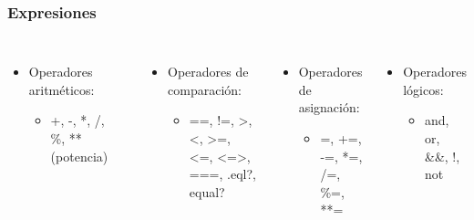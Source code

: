 \documentclass{beamer}
\begin{document}
\begin{frame}
\frametitle{Expresiones}
\begin{columns}[c] %

\begin{itemize}
  \item Operadores aritm\'eticos:
    \begin{itemize}
      \item +, -, *, /, \%, ** (potencia)
    \end{itemize}
\end{itemize}

\frametitle{}
\begin{itemize}
  \item Operadores de comparaci\'on:
  \begin{itemize}
    \item ==, !=, >, <, >=, <=, <=>, ===, .eql?, equal?
  \end{itemize}
\end{itemize}

\begin{itemize}
  \item Operadores de asignaci\'on:
  \begin{itemize}
    \item =, +=, -=, *=, /=, \%=, **=
  \end{itemize}
\end{itemize}

\begin{itemize}
  \item Operadores l\'ogicos:
  \begin{itemize}
    \item and, or, \&\&, !, not
  \end{itemize}
\end{itemize}
\end{columns}
\end{frame}
\end{document}
